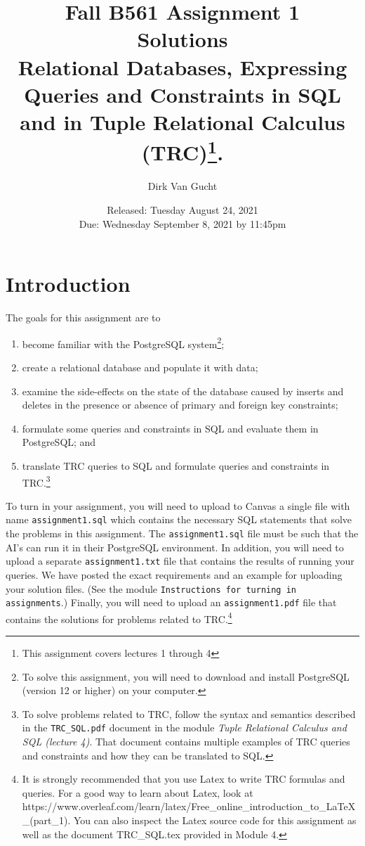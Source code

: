 \documentclass{article}
\begin{document}
\title{Fall B561 Assignment 1 \\
Solutions\\
Relational Databases, Expressing Queries and Constraints in SQL and in Tuple Relational Calculus (TRC)\footnote{This assignment covers lectures 1 through 4}.}
\author{Dirk Van Gucht}
\date{Released: Tuesday August 24, 2021\\ Due: Wednesday September 8, 2021 by 11:45pm}
\maketitle


\section{Introduction}

The goals for this assignment are to 
\begin{enumerate}
\item become familiar with the PostgreSQL system\footnote{To solve this assignment, you will need to download and install PostgreSQL (version 12 or higher) on your computer.};
\item create a relational database and populate it with data;
\item examine the side-effects on the state of the database caused by inserts and deletes in the presence or absence
of primary and foreign key constraints;
\item formulate some queries and constraints in SQL and evaluate them in PostgreSQL; and
\item translate TRC queries to SQL and 
formulate queries and constraints in TRC.\footnote{To solve problems related to TRC, follow the syntax and semantics described in the {\tt TRC\_SQL.pdf} document
in the module \emph{Tuple Relational Calculus and SQL (lecture 4)}.   That document contains multiple examples of
TRC queries and constraints and how they can be translated to SQL.}
\end{enumerate}

To turn in your assignment, you will need to upload to Canvas a single file with name {\tt assignment1.sql} which contains 
the necessary SQL statements that solve the problems in this assignment.   
The {\tt assignment1.sql} file must be such that the AI's can run it in their PostgreSQL environment.  
In addition, you will need to upload a separate {\tt assignment1.txt} file that contains the results of running
your queries.
We have posted the exact requirements and an example for uploading your solution files.  (See the module
{\tt Instructions for turning in assignments}.)
Finally, you will need to upload an {\tt assignment1.pdf} file that contains the solutions for problems related to TRC.\footnote{It is strongly recommended that you use Latex to write TRC formulas and queries.
For a good way to learn about Latex, look at 
https://www.overleaf.com/learn/latex/Free\_online\_introduction\_to\_LaTeX\_(part\_1).
You can also inspect the Latex source code for this assignment as well as the document TRC\_SQL.tex provided in Module 4.}
\end{document}
